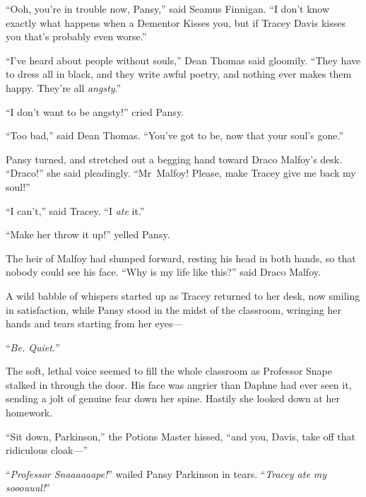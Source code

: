 “Ooh, you’re in trouble now, Pansy,” said Seamus Finnigan. “I don’t know exactly what happens when a Dementor Kisses you, but if Tracey Davis kisses you that’s probably even worse.”

“I’ve heard about people without souls,” Dean Thomas said gloomily. “They have to dress all in black, and they write awful poetry, and nothing ever makes them happy. They’re all \emph{angsty}.”

“I don’t want to be angsty!” cried Pansy.

“Too bad,” said Dean Thomas. “You’ve got to be, now that your soul’s gone.”

Pansy turned, and stretched out a begging hand toward Draco Malfoy’s desk. “Draco!” she said pleadingly. “Mr~Malfoy! Please, make Tracey give me back my soul!”

“I can’t,” said Tracey. “I \emph{ate} it.”

“Make her throw it up!” yelled Pansy.

The heir of Malfoy had slumped forward, resting his head in both hands, so that nobody could see his face. “Why is my life like this?” said Draco Malfoy.

A wild babble of whispers started up as Tracey returned to her desk, now smiling in satisfaction, while Pansy stood in the midst of the classroom, wringing her hands and tears starting from her eyes—

“\emph{Be. Quiet.}”

The soft, lethal voice seemed to fill the whole classroom as Professor Snape stalked in through the door. His face was angrier than Daphne had ever seen it, sending a jolt of genuine fear down her spine. Hastily she looked down at her homework.

“Sit down, Parkinson,” the Potions Master hissed, “and you, Davis, take off that ridiculous cloak—”

“\emph{Professor Snaaaaaape!}” wailed Pansy Parkinson in tears. “\emph{Tracey ate my sooouuul!}”

